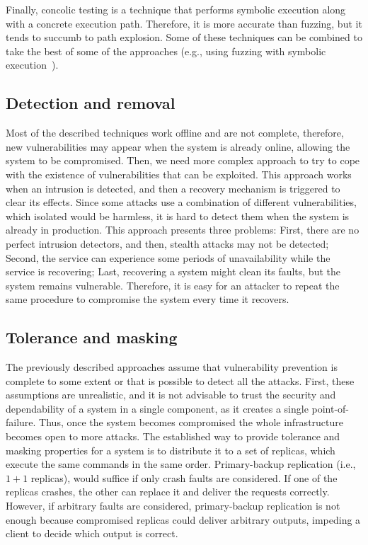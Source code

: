 
Finally, concolic testing is a technique that performs symbolic execution along with a concrete execution path. 
Therefore, it is more accurate than fuzzing, but it tends to succumb to path explosion.
Some of these techniques can be combined to take the best of some of the approaches (e.g., using fuzzing with symbolic execution~\cite{Stephens:2016}).


\subsection{Detection and removal}
Most of the described techniques work offline and are not complete, therefore, new vulnerabilities may appear when the system is already online, allowing the system to be compromised.
Then, we need more complex approach to try to cope with the existence of vulnerabilities that can be exploited.
This approach works when an intrusion is detected, and then a recovery mechanism is triggered to clear its effects. 
Since some attacks use a combination of different vulnerabilities, which isolated would be harmless, it is hard to detect them when the system is already in production. 
This approach presents three problems: 
First, there are no perfect intrusion detectors, and then, stealth attacks may not be detected; 
Second, the service can experience some periods of unavailability while the service is recovering; 
Last, recovering a system might clean its faults, but the system remains vulnerable.
Therefore, it is easy for an attacker to repeat the same procedure to compromise the system every time it recovers.


\subsection{Tolerance and masking}
The previously described approaches assume that vulnerability prevention is complete to some extent or that is possible to detect all the attacks.
First, these assumptions are unrealistic, and it is not advisable to trust the security and dependability of a system in a single component, as it creates a single point-of-failure. 
Thus, once the system becomes compromised the whole infrastructure becomes open to more attacks. 
The established way to provide tolerance and masking properties for a system is to distribute it to a set of replicas, which execute the same commands in the same order. 
Primary-backup replication (i.e., $1 + 1$ replicas), would suffice if only crash faults are considered. 
If one of the replicas crashes, the other can replace it and deliver the requests correctly.
However, if arbitrary faults are considered, primary-backup replication is not enough because compromised replicas could deliver arbitrary outputs, impeding a client to decide which output is correct.

